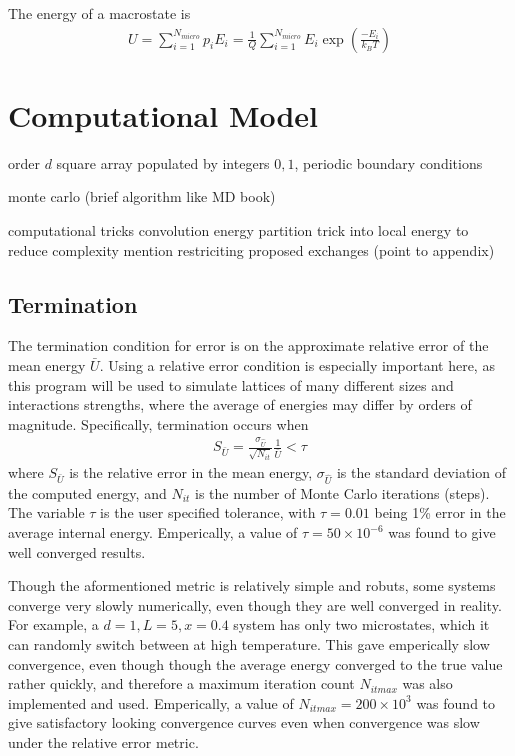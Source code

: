 \documentclass[10pt]{article}
\begin{document}
The energy of a macrostate is
\begin{align}
    U = \sum_{i=1}^{N_{micro}} p_i E_i
    = \frac{1}{Q} \sum_{i=1}^{N_{micro}} E_i \exp\left(\frac{-E_i}{k_B T}\right)
\end{align}

\section{Computational Model}
order $d$ square array populated by integers $0, 1$, periodic boundary conditions

monte carlo (brief algorithm like MD book)

computational tricks
    convolution
    energy partition trick into local energy to reduce complexity
    mention restriciting proposed exchanges (point to appendix)


\subsection{Termination}
The termination condition for error is on the approximate relative error of the mean energy $\bar{U}$.
Using a relative error condition is especially important here, as this program will be used to simulate lattices of many different sizes and interactions strengths, where the average of energies may differ by orders of magnitude.
Specifically, termination occurs when
\begin{align}
    S_{\bar{U}} =
    \frac{\sigma_{\hat{U}}}{\sqrt{N_{it}}} \frac{1}{\bar{U}}
    < \tau
\end{align}
where $S_{\bar{U}}$ is the relative error in the mean energy, $\sigma_{\hat{U}}$ is the standard deviation of the computed energy, and $N_{it}$ is the number of Monte Carlo iterations (steps).
The variable $\tau$ is the user specified tolerance, with $\tau = 0.01$ being 1\% error in the average internal energy.
Emperically, a value of $\tau = 50 \times 10^{-6}$ was found to give well converged results.

Though the aformentioned metric is relatively simple and robuts, some systems converge very slowly numerically, even though they are well converged in reality.
For example, a $d=1, L=5, x=0.4$ system has only two microstates, which it can randomly switch between at high temperature.
This gave emperically slow convergence, even though though the average energy converged to the true value rather quickly, and therefore a maximum iteration count $N_{it max}$ was also implemented and used.
Emperically, a value of $N_{it max} = 200 \times 10^3$ was found to give satisfactory looking convergence curves even when convergence was slow under the relative error metric.
\end{document}
